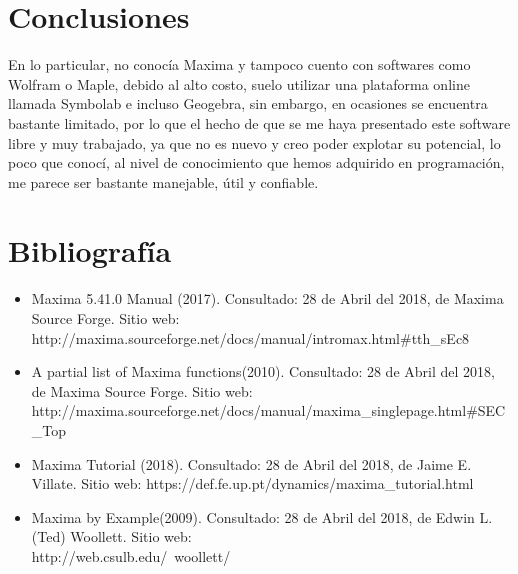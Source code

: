\documentclass[12pt]{article}
\begin{document}
\section{Conclusiones}
En lo particular, no conocía Maxima y tampoco cuento con softwares como Wolfram o Maple, debido al alto costo, suelo utilizar una plataforma online llamada Symbolab e incluso Geogebra, sin embargo, en ocasiones se encuentra bastante limitado, por lo que el hecho de que se me haya presentado este software libre y muy trabajado, ya que no es nuevo y creo poder explotar su potencial, lo poco que conocí, al nivel de conocimiento que hemos adquirido en programación, me parece ser bastante manejable, útil y confiable. 

\section{Bibliografía}

\begin{itemize}
\item Maxima 5.41.0 Manual (2017). Consultado: 28 de Abril del 2018, de Maxima Source Forge. Sitio web: http://maxima.sourceforge.net/docs/manual/intromax.html\#tth\_sEc8
\item A partial list of Maxima functions(2010). Consultado: 28 de Abril del 2018, de Maxima Source Forge. Sitio web:\\
http://maxima.sourceforge.net/docs/manual/maxima\_singlepage.html\#SEC\_Top
\item Maxima Tutorial (2018). Consultado: 28 de Abril del 2018, de Jaime E. Villate. Sitio web: https://def.fe.up.pt/dynamics/maxima\_tutorial.html
\item Maxima by Example(2009). Consultado: 28 de Abril del 2018, de Edwin L. (Ted) Woollett. Sitio web: \\
http://web.csulb.edu/~woollett/
\end{itemize}
\end{document}
